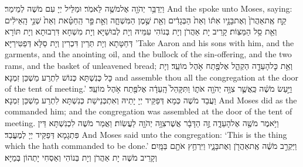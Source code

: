 \newperek
{}
{וַיְדַבֵּ֥ר יְהֹוָ֖ה אֶל\maqqaf מֹשֶׁ֥ה לֵּאמֹֽר׃}
{וּמַלֵּיל יְיָ עִם מֹשֶׁה לְמֵימַר׃}
{And the \lord\space spoke unto Moses, saying:}{}
{קַ֤ח אֶֽת\maqqaf אַהֲרֹן֙ וְאֶת\maqqaf בָּנָ֣יו אִתּ֔וֹ וְאֵת֙ הַבְּגָדִ֔ים וְאֵ֖ת שֶׁ֣מֶן הַמִּשְׁחָ֑ה וְאֵ֣ת \legarmeh  פַּ֣ר הַֽחַטָּ֗את וְאֵת֙ שְׁנֵ֣י הָֽאֵילִ֔ים וְאֵ֖ת סַ֥ל הַמַּצּֽוֹת׃}
{קָרֵיב יָת אַהֲרֹן וְיָת בְּנוֹהִי עִמֵּיהּ וְיָת לְבוּשַׁיָּא וְיָת מִשְׁחָא דִּרְבוּתָא וְיָת תּוֹרָא דְּחַטָּתָא וְיָת תְּרֵין דִּכְרִין וְיָת סַלָּא דְּפַטִּירַיָּא׃}
{’Take Aaron and his sons with him, and the garments, and the anointing oil, and the bullock of the sin-offering, and the two rams, and the basket of unleavened bread;}{}
{וְאֵ֥ת כׇּל\maqqaf הָעֵדָ֖ה הַקְהֵ֑ל אֶל\maqqaf פֶּ֖תַח אֹ֥הֶל מוֹעֵֽד׃}
{וְיָת כָּל כְּנִשְׁתָּא כְּנוֹשׁ לִתְרַע מַשְׁכַּן זִמְנָא׃}
{and assemble thou all the congregation at the door of the tent of meeting.’}{}
{וַיַּ֣עַשׂ מֹשֶׁ֔ה כַּֽאֲשֶׁ֛ר צִוָּ֥ה יְהֹוָ֖ה אֹת֑וֹ וַתִּקָּהֵל֙ הָֽעֵדָ֔ה אֶל\maqqaf פֶּ֖תַח אֹ֥הֶל מוֹעֵֽד׃}
{וַעֲבַד מֹשֶׁה כְּמָא דְּפַקֵּיד יְיָ יָתֵיהּ וְאִתְכְּנֵישַׁת כְּנִשְׁתָּא לִתְרַע מַשְׁכַּן זִמְנָא׃}
{And Moses did as the \lord\space commanded him; and the congregation was assembled at the door of the tent of meeting.}{}
{וַיֹּ֥אמֶר מֹשֶׁ֖ה אֶל\maqqaf הָעֵדָ֑ה זֶ֣ה הַדָּבָ֔ר אֲשֶׁר\maqqaf צִוָּ֥ה יְהֹוָ֖ה לַעֲשֽׂוֹת׃}
{וַאֲמַר מֹשֶׁה לִכְנִשְׁתָּא דֵּין פִּתְגָמָא דְּפַקֵּיד יְיָ לְמֶעֱבַד׃}
{And Moses said unto the congregation: ‘This is the thing which the \lord\space hath commanded to be done.’}{}
{וַיַּקְרֵ֣ב מֹשֶׁ֔ה אֶֽת\maqqaf אַהֲרֹ֖ן וְאֶת\maqqaf בָּנָ֑יו וַיִּרְחַ֥ץ אֹתָ֖ם בַּמָּֽיִם׃}
{וְקָרֵיב מֹשֶׁה יָת אַהֲרֹן וְיָת בְּנוֹהִי וְאַסְחִי יָתְהוֹן בְּמַיָּא׃}
